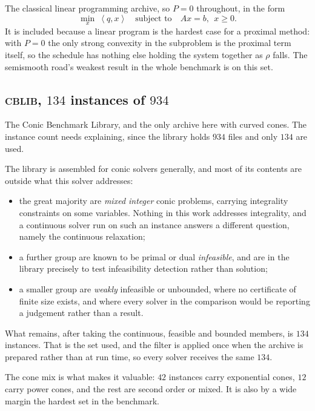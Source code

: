 \documentclass[a4paper,11pt]{book}
\theoremstyle{plain}
\theoremstyle{definition}
\theoremstyle{remark}
\numberwithin{equation}{chapter}
\numberwithin{algorithm}{chapter}
\newcommand{\inner}[2]{\left\langle #1, #2 \right\rangle}
\begin{document}
	The classical linear programming archive, so $P=0$ throughout, in the form
	\[
	\min_x\ \inner{q}{x}
	\quad\text{subject to}\quad
	Ax=b,\ \ x\geq0 .
	\]
	It is included because a linear program is the hardest case for a proximal
	method: with $P=0$ the only strong convexity in the subproblem is the
	proximal term itself, so the schedule has nothing else holding the system
	together as $\rho$ falls. The semismooth road's weakest result in the whole
	benchmark is on this set.

	\subsection{\textsc{cblib}, $134$ instances of $934$}

	The Conic Benchmark Library, and the only archive here with curved cones. The
	instance count needs explaining, since the library holds $934$ files and only
	$134$ are used.

	The library is assembled for conic solvers generally, and most of its
	contents are outside what this solver addresses:

	\begin{itemize}
		\item the great majority are \emph{mixed integer} conic problems, carrying
		integrality constraints on some variables. Nothing in this work addresses
		integrality, and a continuous solver run on such an instance answers a
		different question, namely the continuous relaxation;
		\item a further group are known to be primal or dual \emph{infeasible},
		and are in the library precisely to test infeasibility detection rather
		than solution;
		\item a smaller group are \emph{weakly} infeasible or unbounded, where no
		certificate of finite size exists, and where every solver in the comparison
		would be reporting a judgement rather than a result.
	\end{itemize}

	What remains, after taking the continuous, feasible and bounded members, is
	$134$ instances. That is the set used, and the filter is applied once when
	the archive is prepared rather than at run time, so every solver receives the
	same $134$.

	The cone mix is what makes it valuable: $42$ instances carry exponential
	cones, $12$ carry power cones, and the rest are second order or mixed. It is
	also by a wide margin the hardest set in the benchmark.
\end{document}

